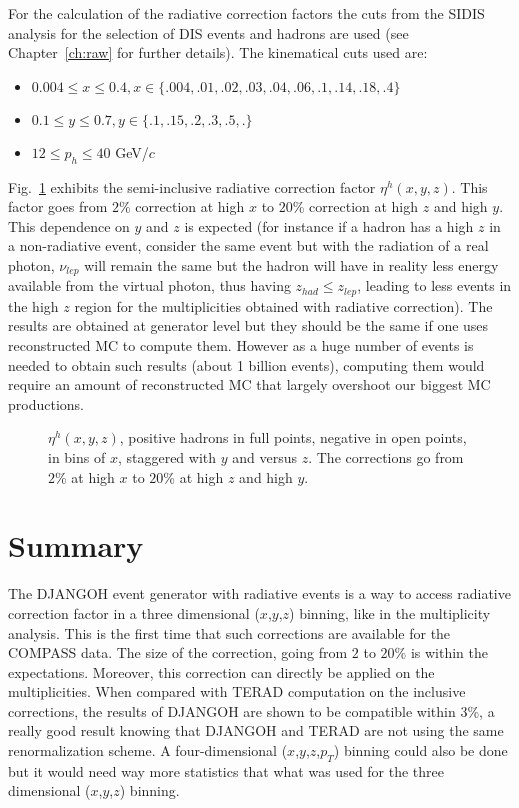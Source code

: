 For the calculation of the radiative correction factors the cuts from the SIDIS analysis for the selection of DIS events and hadrons are used (see Chapter~\ref{ch:raw} for further details). The kinematical cuts used are:

\begin{itemize}
\item $0.004 \leq x \leq 0.4, x \in \{.004,.01,.02,.03,.04,.06,.1,.14,.18,.4\}$
\item $0.1 \leq y \leq 0.7, y \in \{.1,.15,.2,.3,.5,.\}$
\item $12 \leq p_h \leq 40$ GeV/$c$
\end{itemize}

Fig.~\ref{fig:hadz_ratio} exhibits the semi-inclusive radiative correction factor $\eta^{h}(x,y,z)$. This factor goes from $2$\% correction at high $x$ to $20$\% correction at high $z$ and high $y$. This dependence on $y$ and $z$ is expected (for instance if a hadron has a high $z$ in a non-radiative event, consider the same event but with the radiation of a real photon, $\nu_{lep}$ will remain the same but the hadron will have in reality less energy available from the virtual photon, thus having $z_{had} \leq z_{lep}$, leading to less events in the high $z$ region for the multiplicities obtained with radiative correction). The results are obtained at generator level but they should be the same if one uses reconstructed MC to compute them. However as a huge number of events is needed to obtain such results (about 1 billion events), computing them would require an amount of reconstructed MC that largely overshoot our biggest MC productions.

\begin{figure}[!htb]
\centerline{}
\caption{$\eta^{h}(x,y,z)$, positive hadrons in full points, negative in open points, in bins of $x$, staggered with $y$ and versus $z$. The corrections go from $2$\% at high $x$ to $20$\% at high $z$ and high $y$.}\label{fig:hadz_ratio}
\end{figure}


\section{Summary}

The DJANGOH event generator with radiative events is a way to access radiative correction factor in a three dimensional ($x$,$y$,$z$) binning, like in the multiplicity analysis. This is the first time that such corrections are available for the COMPASS data. The size of the correction, going from $2$ to $20$\% is within the expectations. Moreover, this correction can directly be applied on the multiplicities. When compared with TERAD computation on the inclusive corrections, the results of DJANGOH are shown to be compatible within $3$\%, a really good result knowing that DJANGOH and TERAD are not using the same renormalization scheme. A four-dimensional ($x$,$y$,$z$,$p_T$) binning could also be done but it would need way more statistics that what was used for the three dimensional ($x$,$y$,$z$) binning.
